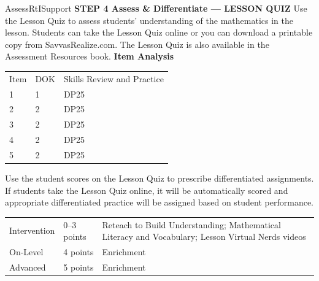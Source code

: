 \documentclass{article}
\newenvironment{te-addendum}[2]{}{}     %
\begin{document}
\begin{te-addendum}{Assess}{RtISupport}
\textbf{STEP 4 Assess & Differentiate — LESSON QUIZ}
Use the Lesson Quiz to assess students' understanding of the mathematics in the lesson.
Students can take the Lesson Quiz online or you can download a printable copy from SavvasRealize.com. The Lesson Quiz is also available in the Assessment Resources book.
\textbf{Item Analysis}
\begin{tabular}{lll}
Item & DOK & Skills Review and Practice \\
1 & 1 & DP25 \\
2 & 2 & DP25 \\
3 & 2 & DP25 \\
4 & 2 & DP25 \\
5 & 2 & DP25 \\
\end{tabular}
Use the student scores on the Lesson Quiz to prescribe differentiated assignments.
If students take the Lesson Quiz online, it will be automatically scored and appropriate differentiated practice will be assigned based on student performance.
\begin{tabular}{lll}
Intervention & 0–3 points & Reteach to Build Understanding; Mathematical Literacy and Vocabulary; Lesson Virtual Nerds videos \\
On-Level & 4 points & Enrichment \\
Advanced & 5 points & Enrichment \\
\end{tabular}
\end{te-addendum}
\end{document}
